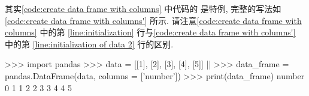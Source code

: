 其实\cref{code:create data frame with columns} 中代码的  是特例, 完整的写法如\cref{code:create data frame with columns'} 所示. 请注意\cref{code:create data frame with columns} 中的第 \ref{line:initialization} 行与\cref{code:create data frame with columns'} 中的第 \ref{line:initialization of data 2} 行的区别.%
%
\begin{codebox}[
  label = code:create data frame with columns',
  caption = 用 \inlinetext{columns} 参数为列指定名称,
]
>>> import pandas
>>> data = [[1], [2], [3], [4], [5]] |\label{line:initialization of data 2}|
>>> data_frame = pandas.DataFrame(data, columns = ['number'])
>>> print(data_frame)
   number
0       1
1       2
2       3
3       4
4       5
\end{codebox}

\subsection[Panel]{}